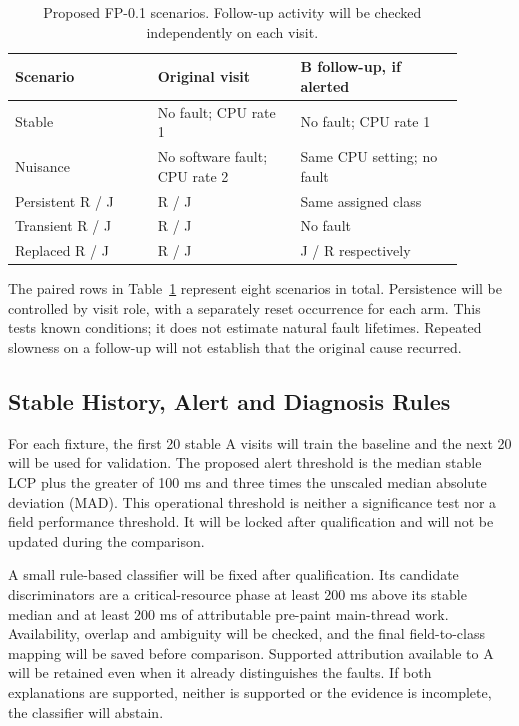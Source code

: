 \begin{table}[htbp]
\centering
\caption{Proposed FP-0.1 scenarios. Follow-up activity will be checked independently on each visit.}
\label{tab:pilot-scenarios}
\begin{tabular}{p{0.29\linewidth}p{0.28\linewidth}p{0.32\linewidth}}
\toprule
Scenario & Original visit & B follow-up, if alerted \\
\midrule
Stable & No fault; CPU rate 1 & No fault; CPU rate 1 \\
Nuisance & No software fault; CPU rate 2 & Same CPU setting; no fault \\
Persistent R / J & R / J & Same assigned class \\
Transient R / J & R / J & No fault \\
Replaced R / J & R / J & J / R respectively \\
\bottomrule
\end{tabular}
\end{table}

The paired rows in Table~\ref{tab:pilot-scenarios} represent eight scenarios in total. Persistence will be controlled by visit role, with a separately reset occurrence for each arm. This tests known conditions; it does not estimate natural fault lifetimes. Repeated slowness on a follow-up will not establish that the original cause recurred.

\subsection{Stable History, Alert and Diagnosis Rules}

For each fixture, the first 20 stable A visits will train the baseline and the next 20 will be used for validation. The proposed alert threshold is the median stable LCP plus the greater of 100 ms and three times the unscaled median absolute deviation (MAD). This operational threshold is neither a significance test nor a field performance threshold. It will be locked after qualification and will not be updated during the comparison.

A small rule-based classifier will be fixed after qualification. Its candidate discriminators are a critical-resource phase at least 200 ms above its stable median and at least 200 ms of attributable pre-paint main-thread work. Availability, overlap and ambiguity will be checked, and the final field-to-class mapping will be saved before comparison. Supported attribution available to A will be retained even when it already distinguishes the faults. If both explanations are supported, neither is supported or the evidence is incomplete, the classifier will abstain.

